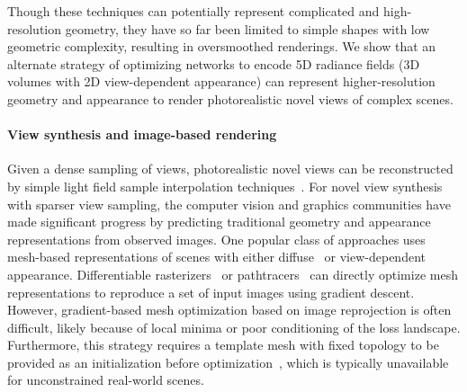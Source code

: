 \documentclass[runningheads]{llncs}
\begin{document}
Though these techniques can potentially represent complicated and high-resolution geometry, they have so far been limited to simple shapes with low geometric complexity, resulting in oversmoothed renderings. We show that an alternate strategy of optimizing networks to encode 5D radiance fields (3D volumes with 2D view-dependent appearance) can represent higher-resolution geometry and appearance to render photorealistic novel views of complex scenes.

\paragraph{\textbf{View synthesis and image-based rendering}}

Given a dense sampling of views, photorealistic novel views can be reconstructed by simple light field sample interpolation techniques~\cite{levoy96,cohen96,davis12}. For novel view synthesis with sparser view sampling, the computer vision and graphics communities have made significant progress by predicting traditional geometry and appearance representations from observed images.
One popular class of approaches uses mesh-based representations of scenes with either diffuse~\cite{waechter14} or view-dependent~\cite{buehler01,debevec96,wood00} appearance.
Differentiable rasterizers~\cite{dibr,genova18,softras,opendr} or pathtracers~\cite{redner,Mitsuba2} can directly optimize mesh representations to reproduce a set of input images using gradient descent.
However, gradient-based mesh optimization based on image reprojection is often difficult, likely because of local minima or poor conditioning of the loss landscape. Furthermore, this strategy requires a template mesh with fixed topology to be provided as an initialization before optimization~\cite{redner}, which is typically unavailable for unconstrained real-world scenes.
\end{document}
